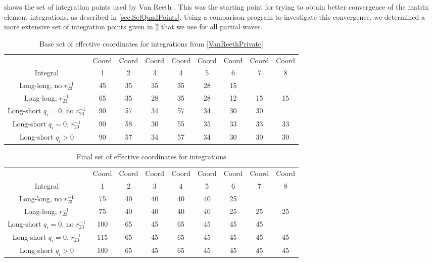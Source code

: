 \documentclass[Dissertation.tex]{subfiles}
\begin{document}
 shows the set of integration points used by Van
Reeth \cite{VanReethPrivate}. This was the starting point for trying to obtain
better convergence of the matrix element integrations, as described in
\cref{sec:SelQuadPoints}. Using a comparison program to investigate this
convergence, we determined a more extensive set of integration points given
in \cref{tab:OptimalEffectiveCoords} that we use for all partial waves.

\begin{table}
\centering
\footnotesize
\begin{tabular}{c c c c c c c c c}
\toprule
 & Coord & Coord & Coord & Coord & Coord & Coord & Coord & Coord\\
Integral & 1 & 2 & 3 & 4 & 5 & 6 & 7 & 8 \\
\midrule
 Long-long, no $r_{23}^{-1}$ & 45 & 35 & 35 & 35 & 28 & 15 & & \\
 Long-long, $r_{23}^{-1}$ & 65 & 35 & 28 & 35 & 28 & 12 & 15 & 15 \\
\midrule
 Long-short $q_i = 0$, no $r_{23}^{-1}$ & 90 & 57 & 34 & 57 & 34 & 30 & 30 & \\
 Long-short $q_i = 0$, $r_{23}^{-1}$ & 90 & 58 & 30 & 55 & 35 & 33 & 33 & 33 \\
 Long-short $q_i > 0$ & 90 & 57 & 34 & 57 & 34 & 30 & 30 & 30 \\
\bottomrule
\end{tabular}
\caption{Base set of effective coordinates for integrations from \cref{VanReethPrivate}}
\label{tab:BaseEffectiveCoords}
\end{table}

\begin{table}
\centering
\footnotesize
\begin{tabular}{c c c c c c c c c}
\toprule
 & Coord & Coord & Coord & Coord & Coord & Coord & Coord & Coord\\
Integral & 1 & 2 & 3 & 4 & 5 & 6 & 7 & 8 \\
\midrule
 Long-long, no $r_{23}^{-1}$			&  75 & 40 & 40 & 40 & 40 & 25 & & \\
 Long-long, $r_{23}^{-1}$				&  75 & 40 & 40 & 40 & 40 & 25 & 25 & 25 \\
\midrule
 Long-short $q_i = 0$, no $r_{23}^{-1}$	& 100 & 65 & 45 & 65 & 45 & 45 & 45 & \\
 Long-short $q_i = 0$, $r_{23}^{-1}$	& 115 & 65 & 45 & 65 & 45 & 45 & 45 & 45 \\
 Long-short $q_i > 0$					& 100 & 65 & 45 & 65 & 45 & 45 & 45 & 45 \\
\bottomrule
\end{tabular}
\caption{Final set of effective coordinates for integrations}
\label{tab:OptimalEffectiveCoords}
\end{table}
\end{document}
